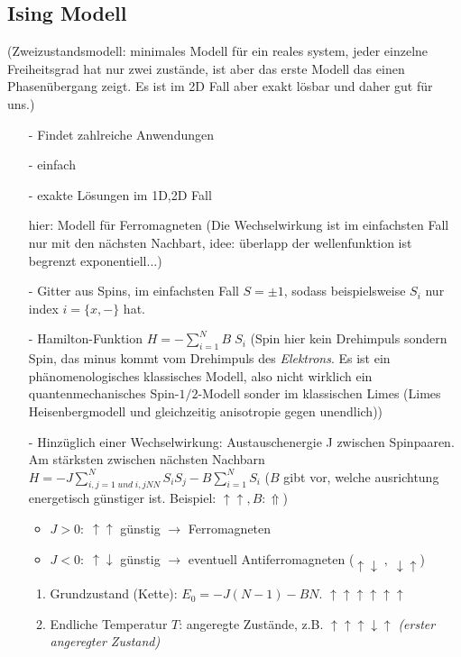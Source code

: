 \documentclass[12pt]{article}
\begin{document}
 \subsection{Ising Modell}
(Zweizustandsmodell: minimales Modell für ein reales system, jeder einzelne Freiheitsgrad hat nur zwei zustände, ist aber das erste Modell das einen Phasenübergang zeigt. Es ist im 2D Fall aber exakt lösbar und daher gut für uns.)
\begin{itemize}
\item[-]Findet zahlreiche Anwendungen
\item[-]einfach
\item[-]exakte Lösungen im 1D,2D Fall

 hier: Modell für Ferromagneten %
 (Die Wechselwirkung ist im einfachsten Fall nur mit den nächsten Nachbart, idee: überlapp der wellenfunktion ist begrenzt exponentiell...)
\item[-] Gitter aus Spins, im einfachsten Fall $S= \pm 1$, sodass beispielsweise $S_i$ nur index $i= \{x,-\}$ hat.
\item[-]Hamilton-Funktion $H= - \sum_{i=1}^N B \; S_i$ (Spin hier kein Drehimpuls sondern Spin, das minus kommt vom Drehimpuls des \textit{Elektrons}. Es ist ein phänomenologisches klassisches Modell, also nicht wirklich ein quantenmechanisches Spin-$1/2$-Modell sonder im klassischen Limes (Limes Heisenbergmodell und gleichzeitig anisotropie gegen unendlich)) 
 \item[-]Hinzüglich einer Wechselwirkung: Austauschenergie J zwischen Spinpaaren. Am stärksten zwischen nächsten Nachbarn $ H= -J \sum_{i,j=1\; und \; i,j NN}^N S_i S_j - B \sum_{i=1}^N S_i$ ($B$ gibt vor, welche ausrichtung energetisch günstiger ist. Beispiel: $\uparrow \uparrow, B: \Uparrow$)
  \begin{itemize}
  \item $J>0: \; \uparrow \uparrow $ günstig $\rightarrow$ Ferromagneten
  \item $J<0: \; \uparrow \downarrow$ günstig $\rightarrow$ eventuell Antiferromagneten ($\uparrow \downarrow \; , \; \downarrow \uparrow$)
  \end{itemize}

\begin{enumerate}
\item Grundzustand (Kette): $E_0= -J(N-1)-BN $. $\uparrow \uparrow \uparrow \uparrow \uparrow \uparrow$
\item Endliche Temperatur $T$: angeregte Zustände, z.B. $\uparrow \uparrow \uparrow \downarrow \uparrow$ \textit{(erster angeregter Zustand)}
\end{enumerate}


\end{itemize}
\end{document}
